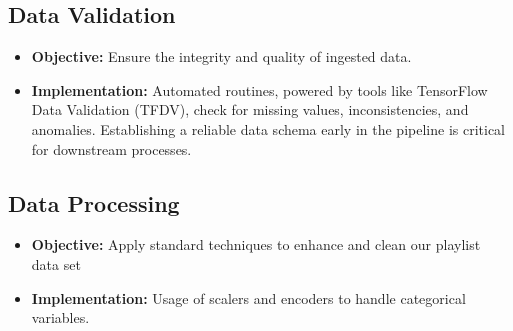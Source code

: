 \documentclass{article}
\begin{document}
\subsection{Data Validation}
\begin{itemize}
    \item \textbf{Objective:} Ensure the integrity and quality of ingested data.
    \item \textbf{Implementation:} Automated routines, powered by tools like TensorFlow Data Validation (TFDV), check for missing values, inconsistencies, and anomalies. Establishing a reliable data schema early in the pipeline is critical for downstream processes.
\end{itemize}

\subsection{Data Processing}
\begin{itemize}
    \item \textbf{Objective:} Apply standard techniques to enhance and clean our playlist data set
    \item \textbf{Implementation:} Usage of scalers and encoders to handle categorical variables.
\end{itemize}
\end{document}
